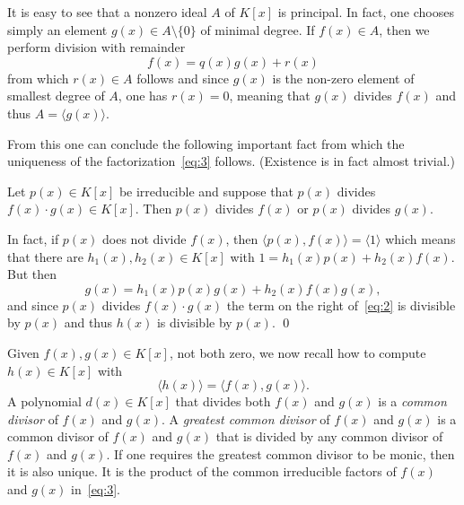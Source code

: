It is easy to see that a nonzero ideal $A$ of $K[x]$ is principal. In fact, one chooses simply an element $g(x) ∈A \setminus \{0\}$ of minimal degree. If $f(x) ∈A$, then we perform division with remainder
\begin{displaymath}
  f(x)  = q(x) g(x) + r(x) 
\end{displaymath}
from which $r(x) ∈A$ follows and since $g(x)$ is the non-zero  element of smallest degree of $A$, one has $r(x) = 0$, meaning that $g(x)$ divides $f(x)$ and thus $A = 〈g(x)〉$.

From this one can conclude the following important fact from which the uniqueness of the factorization~\eqref{eq:3} follows. (Existence is in fact almost trivial.)
\begin{theorem}
  \label{thr:9}
  Let $p(x) ∈K[x]$ be irreducible and suppose that $p(x)$ divides $f(x) ⋅ g(x) ∈ K[x]$. Then $p(x)$ divides $f(x)$ or $p(x)$ divides $g(x)$. 
\end{theorem}
{\small \noindent 
  In fact, if $p(x)$ does not divide $f(x)$, then $〈p(x),f(x)〉 = 〈1〉$ which means that there are $h_1(x), h_2(x) ∈ K[x]$ with $1 = h_1(x) p(x) + h_2(x) f(x)$. But then
  \begin{equation}
    \label{eq:2}
    g(x) = h_1(x) p(x)  g(x)+ h_2(x) f(x) g(x),
  \end{equation}
  and since $p(x)$ divides $f(x) ⋅g(x)$ the term on the right of~\eqref{eq:2} is divisible by $p(x)$ and thus $h(x)$ is divisible by $p(x)$. \qed
  
}


Given $f(x),g(x) ∈K[x]$, not both zero, we now recall how to compute $h(x) ∈ K[x]$ with
\begin{displaymath}
  〈h(x) 〉 = 〈 f(x),g(x) 〉. 
\end{displaymath}
A polynomial $d(x) ∈K[x]$ that divides both $f(x)$ and $g(x)$ is a \emph{common divisor} of $f(x)$ and $g(x)$. A \emph{greatest common divisor} of $f(x)$ and $g(x)$ is a common divisor of $f(x)$ and $g(x)$ that is divided by any common divisor of $f(x)$ and $g(x)$.  If one requires the greatest common divisor to be monic, then it is also unique. It is the product of the common irreducible factors of $f(x)$ and $g(x)$ in~\eqref{eq:3}.

